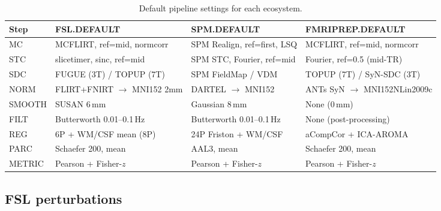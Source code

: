 \documentclass[11pt,a4paper]{article}
\begin{document}
\begin{table}[H]
\centering
\small
\caption{Default pipeline settings for each ecosystem.}
\label{tab:defaults}
\begin{tabular}{@{}llll@{}}
\toprule
Step & FSL.DEFAULT & SPM.DEFAULT & FMRIPREP.DEFAULT \\
\midrule
MC     & MCFLIRT, ref=mid, normcorr    & SPM Realign, ref=first, LSQ    & MCFLIRT, ref=mid, normcorr \\
STC    & slicetimer, sinc, ref=mid     & SPM STC, Fourier, ref=mid      & Fourier, ref=0.5 (mid-TR) \\
SDC    & FUGUE (3T) / TOPUP (7T)       & SPM FieldMap / VDM              & TOPUP (7T) / SyN-SDC (3T) \\
NORM   & FLIRT+FNIRT $\to$ MNI152 2mm  & DARTEL $\to$ MNI152             & ANTs SyN $\to$ MNI152NLin2009c \\
SMOOTH & SUSAN 6\,mm                    & Gaussian 8\,mm                   & None (0\,mm) \\
FILT   & Butterworth 0.01--0.1\,Hz      & Butterworth 0.01--0.1\,Hz       & None (post-processing) \\
REG    & 6P + WM/CSF mean (8P)         & 24P Friston + WM/CSF            & aCompCor + ICA-AROMA \\
PARC   & Schaefer 200, mean            & AAL3, mean                      & Schaefer 200, mean \\
METRIC & Pearson + Fisher-$z$          & Pearson + Fisher-$z$            & Pearson + Fisher-$z$ \\
\bottomrule
\end{tabular}
\end{table}

\subsection{FSL perturbations}
\end{document}
